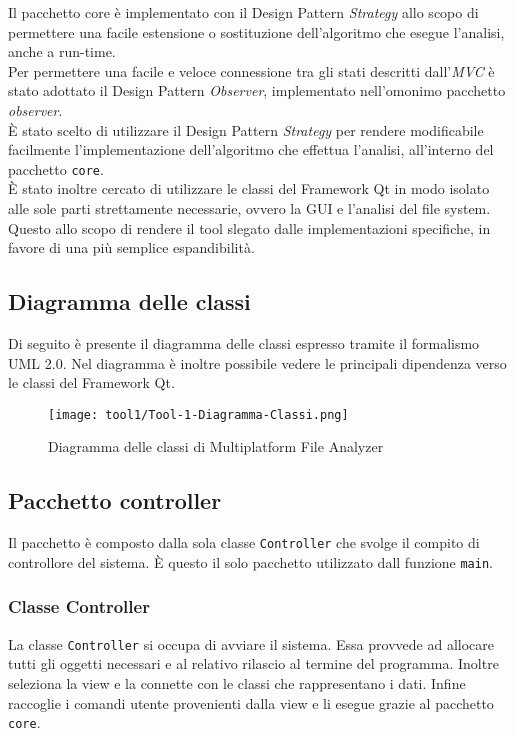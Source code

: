 	Il pacchetto core è implementato con il Design Pattern \textit{Strategy} allo scopo di permettere una facile estensione o sostituzione dell'algoritmo che esegue l'analisi, anche a run-time.\\
	
	Per permettere una facile e veloce connessione tra gli stati descritti dall'\textit{MVC} è stato adottato il Design Pattern \textit{Observer}, implementato nell'omonimo pacchetto \textit{observer}.\\
	
	È stato scelto di utilizzare il Design Pattern \textit{Strategy} per rendere modificabile facilmente l'implementazione dell'algoritmo che effettua l'analisi, all'interno del pacchetto \texttt{core}.\\
	
	È stato inoltre cercato di utilizzare le classi del Framework Qt in modo isolato alle sole parti strettamente necessarie, ovvero la GUI e l'analisi del file system. Questo allo scopo di rendere il tool slegato dalle implementazioni specifiche, in favore di una più semplice espandibilità.
	
	\subsection{Diagramma delle classi}
		Di seguito è presente il diagramma delle classi espresso tramite il formalismo UML 2.0. Nel diagramma è inoltre possibile vedere le principali dipendenza verso le classi del Framework Qt.
		
		\begin{figure}[!h] 
			\centering 
			\texttt{[image: tool1/Tool-1-Diagramma-Classi.png]} 
			\caption{Diagramma delle classi di Multiplatform File Analyzer}
		\end{figure}
	
		\newpage
	
	\subsection{Pacchetto controller}
		Il pacchetto è composto dalla sola classe \texttt{Controller} che svolge il compito di controllore del sistema. È questo il solo pacchetto utilizzato dall funzione \texttt{main}.
		
		\subsubsection{Classe Controller}
			La classe \texttt{Controller} si occupa di avviare il sistema. Essa provvede ad allocare tutti gli oggetti necessari e al relativo rilascio al termine del programma. Inoltre seleziona la view e la connette con le classi che rappresentano i dati. Infine raccoglie i comandi utente provenienti dalla view e li esegue grazie al pacchetto \texttt{core}.
	
